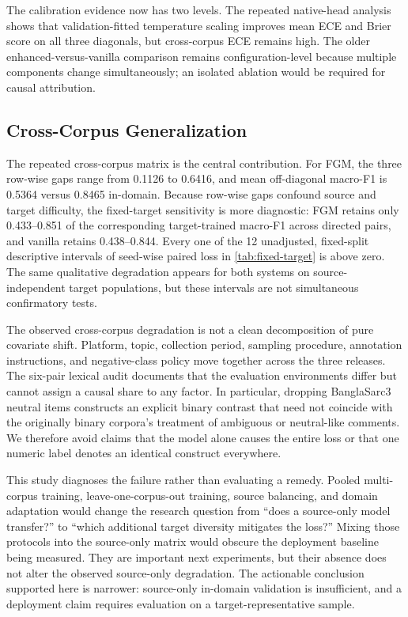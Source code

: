 \documentclass{ieeeaccess}
\begin{document}
The calibration evidence now has two levels. The repeated native-head analysis shows that validation-fitted temperature scaling improves mean ECE and Brier score on all three diagonals, but cross-corpus ECE remains high. The older enhanced-versus-vanilla comparison remains configuration-level because multiple components change simultaneously; an isolated ablation would be required for causal attribution.

\subsection{Cross-Corpus Generalization}
\label{sec:discussion-deployment}

The repeated cross-corpus matrix is the central contribution. For FGM, the
three row-wise gaps range from 0.1126 to 0.6416, and mean off-diagonal macro-F1
is 0.5364 versus 0.8465 in-domain. Because row-wise gaps confound source and
target difficulty, the fixed-target sensitivity is more diagnostic: FGM
retains only 0.433--0.851 of the corresponding target-trained macro-F1 across
directed pairs, and vanilla retains 0.438--0.844. Every one of the 12
unadjusted, fixed-split descriptive intervals of seed-wise paired loss in
\cref{tab:fixed-target} is above zero. The same qualitative degradation appears
for both systems on source-independent target populations, but these intervals
are not simultaneous confirmatory tests.

The observed cross-corpus degradation is not a clean decomposition of pure covariate shift. Platform, topic, collection period, sampling procedure, annotation instructions, and negative-class policy move together across the three releases. The six-pair lexical audit documents that the evaluation environments differ but cannot assign a causal share to any factor. In particular, dropping BanglaSarc3 neutral items constructs an explicit binary contrast that need not coincide with the originally binary corpora's treatment of ambiguous or neutral-like comments. We therefore avoid claims that the model alone causes the entire loss or that one numeric label denotes an identical construct everywhere.

This study diagnoses the failure rather than evaluating a remedy. Pooled multi-corpus training, leave-one-corpus-out training, source balancing, and domain adaptation would change the research question from ``does a source-only model transfer?'' to ``which additional target diversity mitigates the loss?'' Mixing those protocols into the source-only matrix would obscure the deployment baseline being measured. They are important next experiments, but their absence does not alter the observed source-only degradation. The actionable conclusion supported here is narrower: source-only in-domain validation is insufficient, and a deployment claim requires evaluation on a target-representative sample.
\end{document}
